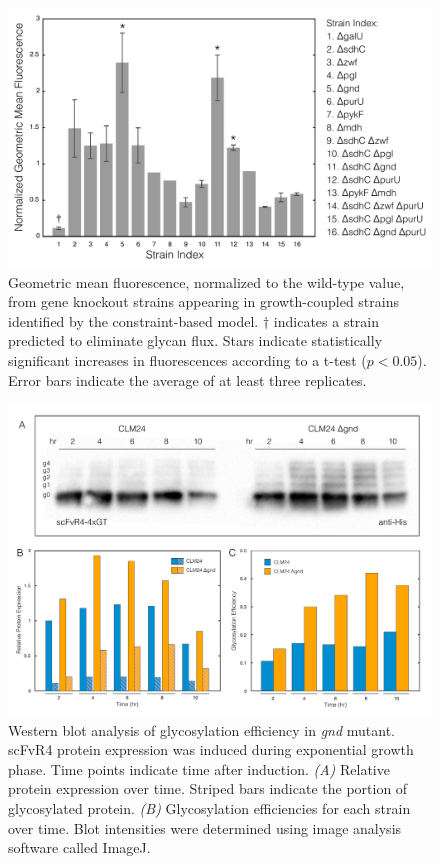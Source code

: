 \documentclass[12pt]{article}
\begin{document}

\clearpage

\begin{figure}\centering
\includegraphics[width=1.0\textwidth]{./figures/fig4-glycan-FACS.pdf}
\caption{Geometric mean fluorescence, normalized to the wild-type value, from gene knockout strains appearing in growth-coupled strains identified by the constraint-based model. $\dagger$ indicates a strain predicted to eliminate glycan flux. Stars indicate statistically significant increases in fluorescences according to a t-test ($p<0.05$). Error bars indicate the average of at least three replicates.}
\label{fig-glycan-FACS}
\end{figure}


\clearpage

\begin{figure}\centering
\includegraphics[width=1.0\textwidth]{./figures/fig5-western-gnd.pdf}
\caption{Western blot analysis of glycosylation efficiency in \textit{gnd} mutant. scFvR4 protein expression was induced during exponential growth phase. Time points indicate time after induction. \textit{(A)} Relative protein expression over time. Striped bars indicate the portion of glycosylated protein. \textit{(B)} Glycosylation efficiencies for each strain over time. Blot intensities were determined using image analysis software called ImageJ.}
\label{fig-western-gnd}
\end{figure}
\end{document}
